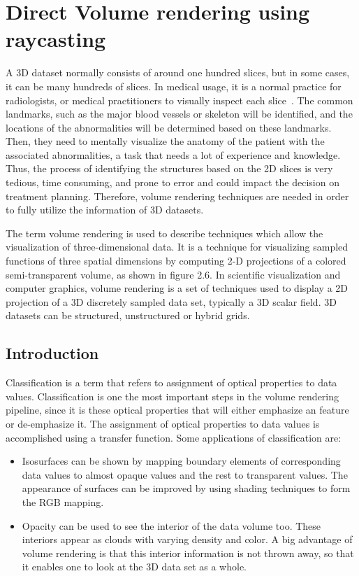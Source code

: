 

\chapter{Direct Volume rendering using raycasting}\label{chap:errors}


A 3D dataset normally consists of around one hundred slices, but in some cases, it can be many hundreds of slices. In medical usage, it is a normal practice for radiologists, or medical practitioners to visually inspect each slice~\cite{62}. The common landmarks, such as the major blood vessels or skeleton will be identified, and the locations of the abnormalities will be determined based on these landmarks. Then, they need to mentally visualize the anatomy of the patient with the associated abnormalities,  a task that needs a lot of experience and knowledge. Thus, the process of identifying the structures based on the 2D slices is very tedious, time consuming, and prone to error and could impact the decision on treatment planning. Therefore, volume rendering techniques are needed in order to fully utilize the information of 3D datasets.

The term volume rendering is used to describe techniques which allow the visualization of three-dimensional data. It is a technique for visualizing sampled functions of three spatial dimensions by computing 2-D projections of a colored semi-transparent volume, as shown in figure 2.6. In scientific visualization and computer graphics, volume rendering is a set of techniques used to display a 2D projection of a 3D discretely sampled data set, typically a 3D scalar field. 3D datasets can be structured, unstructured or hybrid grids. 


\section{Introduction}

Classification is a term that refers to assignment of optical properties to data values. Classification is one the most important steps in the volume rendering pipeline, since it is these optical properties that will either emphasize an feature or de-emphasize it. The assignment of optical properties to data values is accomplished using a transfer function. Some applications of classification are:

\begin{itemize}

\item Isosurfaces can be shown by mapping boundary elements of corresponding data values to almost opaque values and the rest to transparent values. The appearance of surfaces can be improved by using shading techniques to form the RGB mapping. 

\item Opacity can be used to see the interior of the data volume too. These interiors appear as clouds with varying density and color. A big advantage of volume rendering is that this interior information is not thrown away, so that it enables one to look at the 3D data set as a whole. 

\end{itemize}

